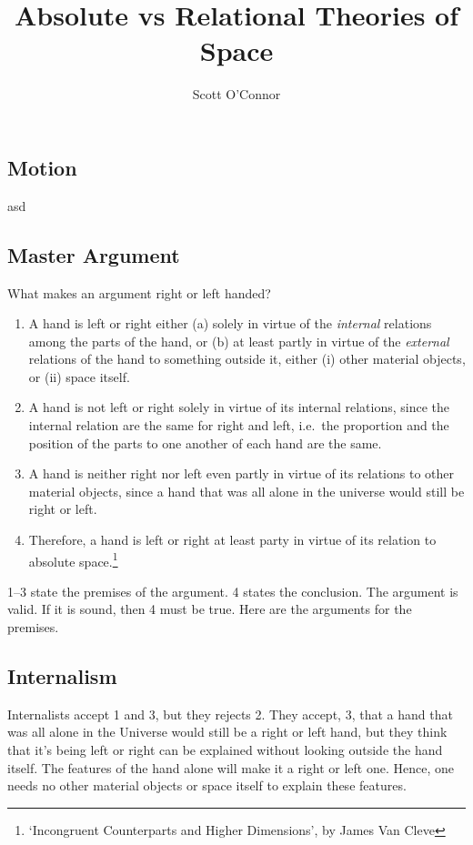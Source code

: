\documentclass[]{article}
\title{Absolute vs Relational Theories of Space}
\author{Scott O’Connor}
\begin{document}
\maketitle


\subsection{Motion}\label{motion}

asd

\subsection{Master Argument}\label{master-argument}

What makes an argument right or left handed?

\begin{enumerate}
\def\labelenumi{\arabic{enumi}.}
\item
  A hand is left or right either (a) solely in virtue of the
  \emph{internal} relations among the parts of the hand, or (b) at least
  partly in virtue of the \emph{external} relations of the hand to
  something outside it, either (i) other material objects, or (ii) space
  itself.
\item
  A hand is not left or right solely in virtue of its internal
  relations, since the internal relation are the same for right and
  left, i.e.~the proportion and the position of the parts to one another
  of each hand are the same.
\item
  A hand is neither right nor left even partly in virtue of its
  relations to other material objects, since a hand that was all alone
  in the universe would still be right or left.
\item
  Therefore, a hand is left or right at least party in virtue of its
  relation to absolute space.\footnote{`Incongruent Counterparts and
    Higher Dimensions', by James Van Cleve}
\end{enumerate}

1--3 state the premises of the argument. 4 states the conclusion. The
argument is valid. If it is sound, then 4 must be true. Here are the
arguments for the premises.

\subsection{Internalism}\label{internalism}

Internalists accept 1 and 3, but they rejects 2. They accept, 3, that a
hand that was all alone in the Universe would still be a right or left
hand, but they think that it's being left or right can be explained
without looking outside the hand itself. The features of the hand alone
will make it a right or left one. Hence, one needs no other material
objects or space itself to explain these features.
\end{document}
